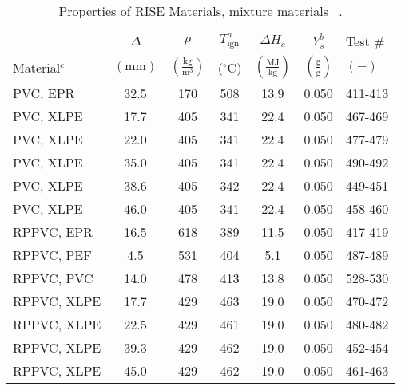 \begin{table}[!ht]
\caption[Properties of RISE Materials, mixture materials]{Properties of RISE Materials, mixture materials ~\cite{RISE:Fire_Database}.}
\centering
\begin{tabular}{|l|c|c|c|c|c|p{3.7cm}|}
\hline
            & \centering$\Delta$& \centering$\rho$& \centering$T_{\mathrm{ign}}^{a}$&\centering$\Delta H_{c}$&\centering$Y_{s}^{b}$ & Test \# \\
Material$^{c}$    & \centering$\mathrm{\left(mm\right)}$ & \centering$\mathrm{\left(\frac{kg}{m^{3}}\right)}$ &  \centering($\mathrm{^{\circ}C}$)   & \centering$\left(\mathrm{\frac{MJ}{kg}}\right)$ & \centering$\mathrm{\left(\frac{g}{g}\right)}$ & $\mathrm{( - )}$  \\ \hline
\hline
PVC, EPR                                          & 32.5 & 170 & 508 & 13.9 & 0.050 & 411-413 \\\hline
PVC, XLPE                                         & 17.7 & 405 & 341 & 22.4 & 0.050 & 467-469 \\\hline
PVC, XLPE                                         & 22.0 & 405 & 341 & 22.4 & 0.050 & 477-479 \\\hline
PVC, XLPE                                         & 35.0 & 405 & 341 & 22.4 & 0.050 & 490-492 \\\hline
PVC, XLPE                                         & 38.6 & 405 & 342 & 22.4 & 0.050 & 449-451 \\\hline
PVC, XLPE                                         & 46.0 & 405 & 341 & 22.4 & 0.050 & 458-460 \\\hline
RPPVC, EPR                                        & 16.5 & 618 & 389 & 11.5 & 0.050 & 417-419 \\\hline
RPPVC, PEF                                        & 4.5 & 531 & 404 & 5.1 & 0.050 & 487-489 \\\hline
RPPVC, PVC                                        & 14.0 & 478 & 413 & 13.8 & 0.050 & 528-530 \\\hline
RPPVC, XLPE                                       & 17.7 & 429 & 463 & 19.0 & 0.050 & 470-472 \\\hline
RPPVC, XLPE                                       & 22.5 & 429 & 461 & 19.0 & 0.050 & 480-482 \\\hline
RPPVC, XLPE                                       & 39.3 & 429 & 462 & 19.0 & 0.050 & 452-454 \\\hline
RPPVC, XLPE                                       & 45.0 & 429 & 462 & 19.0 & 0.050 & 461-463 \\\hline

\end{tabular}
\end{table}
